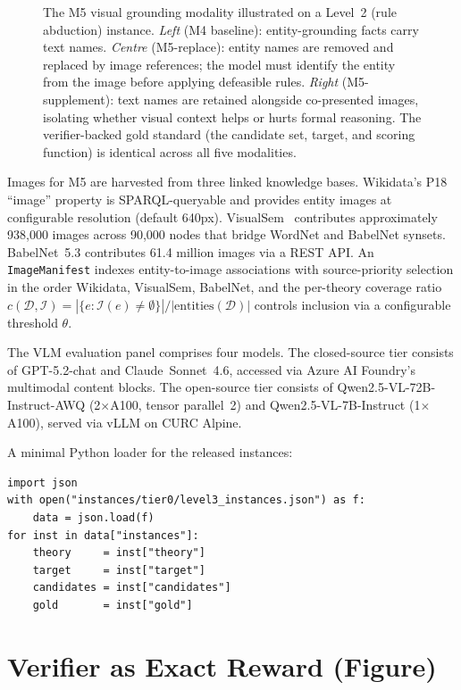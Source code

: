 \documentclass{article}
\theoremstyle{definition}
\newcommand{\D}{\mathcal{D}}
\begin{document}
\begin{figure}[h]
\centering
\resizebox{\textwidth}{!}{}
\caption{The M5 visual grounding modality illustrated on a Level~2 (rule abduction) instance. \emph{Left} (M4 baseline): entity-grounding facts carry text names. \emph{Centre} (M5-replace): entity names are removed and replaced by image references; the model must identify the entity from the image before applying defeasible rules. \emph{Right} (M5-supplement): text names are retained alongside co-presented images, isolating whether visual context helps or hurts formal reasoning. The verifier-backed gold standard (the candidate set, target, and scoring function) is identical across all five modalities.}
\label{fig:m5}
\end{figure}

Images for M5 are harvested from three linked knowledge bases. Wikidata's P18 ``image'' property is SPARQL-queryable and provides entity images at configurable resolution (default 640px). VisualSem~\citep{geigle2024babelimagenet} contributes approximately 938{,}000 images across 90{,}000 nodes that bridge WordNet and BabelNet synsets. BabelNet~5.3 contributes 61.4 million images via a REST API. An \texttt{ImageManifest} indexes entity-to-image associations with source-priority selection in the order Wikidata, VisualSem, BabelNet, and the per-theory coverage ratio $c(\D, \mathcal{I}) = |\{e : \mathcal{I}(e) \neq \emptyset\}| / |\mathrm{entities}(\D)|$ controls inclusion via a configurable threshold $\theta$.

The VLM evaluation panel comprises four models. The closed-source tier consists of GPT-5.2-chat and Claude~Sonnet~4.6, accessed via Azure AI Foundry's multimodal content blocks. The open-source tier consists of Qwen2.5-VL-72B-Instruct-AWQ (2$\times$A100, tensor parallel~2) and Qwen2.5-VL-7B-Instruct (1$\times$A100), served via vLLM on CURC Alpine.

A minimal Python loader for the released instances:
\begin{verbatim}
import json
with open("instances/tier0/level3_instances.json") as f:
    data = json.load(f)
for inst in data["instances"]:
    theory     = inst["theory"]
    target     = inst["target"]
    candidates = inst["candidates"]
    gold       = inst["gold"]
\end{verbatim}


\section{Verifier as Exact Reward (Figure)}\label{app:finetuning}
\end{document}

